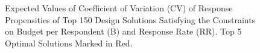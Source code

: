\documentclass[12pt]{article}
\begin{document}
\begin{figure}[!htbp]
\centering \makeatletter
\begin{subfigure}{.5\textwidth}
	\centering
\end{subfigure}%
\begin{subfigure}{.5\textwidth}
	\centering
\end{subfigure}%
\makeatother
\caption{{Expected Values of Coefficient of Variation (CV) of Response Propensities of Top 150 Design Solutions Satisfying the Constraints on Budget per Respondent (B) and Response Rate (RR). Top 5 Optimal Solutions Marked in Red.}}
\label{fig-optimal-designs}
\end{figure}
\egroup
\end{document}
